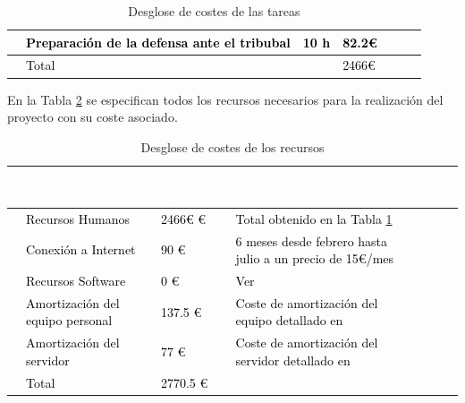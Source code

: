 \begin{table}[H]
\begin{adjustbox}{max height=\textheight,max width=\textwidth}
\begin{tabular}{|clllrrl|}
    \hline
    \rowcolor{white} \multicolumn{1}{|l}{}  & \textcolor{black}{Preparación de la defensa ante el tribubal} & \textcolor{black}{10 h}         & \textcolor{black}{82.2€} &\\                                  
    \hline
    \rowcolor{white} \multicolumn{1}{|l}{}  & \textcolor{black}{Total} & \textcolor{black}{}         & \textcolor{black}{2466€} &\\                                  
    \hline
    \end{tabular}
    \end{adjustbox}
    \caption{Desglose de costes de las tareas}
    \label{fig:CosteTareas}
\end{table}

En la Tabla \ref{fig:CosteRecursos} se especifican todos los recursos necesarios para la realización del proyecto con su coste asociado.

\begin{table}[H]
    \centering
    \begin{adjustbox}{max height=\textheight, max width=\textwidth}
    \begin{tabular}{|clllrrl|} 
    \hline
    \rowcolor{black} \multicolumn{1}{|l}{}  & \textcolor{white}{Recursos} & \textcolor{white}{Importe (€)}         & \textcolor{white}{Detalle} \\                                      
    \hline
    \rowcolor{white} \multicolumn{1}{|l}{}  & \textcolor{black}{Recursos Humanos} & \textcolor{black}{2466€ €}         & \textcolor{black}{Total obtenido en la Tabla \ref{fig:CosteTareas}} &\\
    \hline
    \rowcolor{white} \multicolumn{1}{|l}{}  & \textcolor{black}{Conexión a Internet} & \textcolor{black}{90 €}         & \textcolor{black}{6 meses desde febrero hasta julio a un precio de 15€/mes } &\\
    \hline
    \rowcolor{white} \multicolumn{1}{|l}{}  & \textcolor{black}{Recursos Software} & \textcolor{black}{0 €}         & \textcolor{black}{Ver \textit{\nameref{RecursosSoftware}}} &\\
    \hline
    \rowcolor{white} \multicolumn{1}{|l}{}  & \textcolor{black}{Amortización del equipo personal} & \textcolor{black}{137.5 €}         & \textcolor{black}{Coste de amortización del equipo detallado en \textit{\nameref{RecursosHardware}}} &\\
    \hline
    \rowcolor{white} \multicolumn{1}{|l}{}  & \textcolor{black}{Amortización del servidor} & \textcolor{black}{77 €}         & \textcolor{black}{Coste de amortización del servidor detallado en \textit{\nameref{RecursosHardware}}} &\\
    \hline
    \rowcolor{white} \multicolumn{1}{|l}{}  & \textcolor{black}{Total} & \textcolor{black}{2770.5 €}         & \textcolor{black}{} &\\
    \hline
    \end{tabular}
    \end{adjustbox}
    \caption{Desglose de costes de los recursos}
    \label{fig:CosteRecursos}
\end{table}
